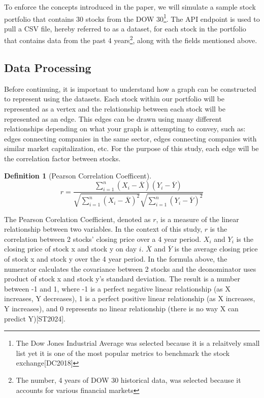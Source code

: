 \documentclass{article}
\newtheorem{definition}[theorem]{Definition}
\begin{document}
To enforce the concepts introduced in the paper, we will simulate a sample stock portfolio that contains 30 stocks from the DOW 30\footnote{The Dow Jones Industrial Average was selected because it is a relaitvely small list yet it is one of the most popular metrics to benchmark the stock exchange[DC2018]}. The API endpoint is used to pull a CSV file, hereby referred to as a dataset, for each stock in the portfolio that contains data from the past 4 years\footnote{The number, 4 years of DOW 30 historical data, was selected because it accounts for various financial markets}, along with the fields mentioned above.

\subsection{Data Processing}

Before continuing, it is important to understand how a graph can be constructed to represent using the datasets. Each stock within our portfolio will be represented as a vertex and the relationship between each stock will be represented as an edge. This edges can be drawn using many different relationships depending on what your graph is attempting to convey, such as: edges connecting companies in the same sector, edges connecting companies with similar market capitalization, etc. For the purpose of this study, each edge will be the correlation factor between stocks.

\begin{definition}[Pearson Correlation Coefficent]
\[
r = \frac{\sum_{i=1}^n (X_i - \overline{X})(Y_i - \overline{Y})}{\sqrt{\sum_{i=1}^n (X_i - \overline{X})^2} \sqrt{\sum_{i=1}^n (Y_i - \overline{Y})^2}}
\]
\end{definition}


The Pearson Corelation Coefficient, denoted as $r$, is a measure of the linear relationship between two variables. In the context of this study, $r$ is the correlation between 2 stocks' closing price over a 4 year period. $X_i$ and $Y_i$ is the closing price of stock x and stock y on day $i$. $\overline{X}$ and $\overline{Y}$ is the average closing price of stock x and stock y over the 4 year period. In the formula above, the numerator calculates the covariance between 2 stocks and the deonominator uses product of stock x and stock y's standard deviation. The result is a number between -1 and 1, where -1 is a perfect negative linear relationship (as X increases, Y decreases), 1 is a perfect positive linear relationship (as X increases, Y increases), and 0 represents no linear relationship (there is no way X can predict Y)[ST2024]. 
\end{document}
